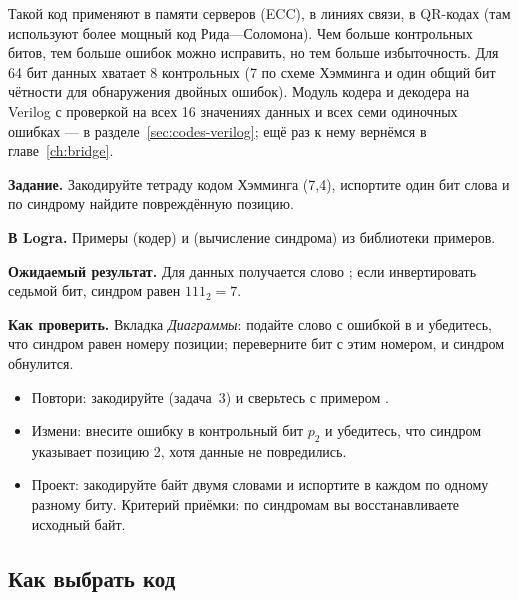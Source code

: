 Такой код применяют в памяти серверов (ECC), в линиях связи, в QR-кодах (там
используют более мощный код Рида---Соломона). Чем больше контрольных битов,
тем больше ошибок можно исправить, но тем больше избыточность. Для 64 бит
данных хватает 8 контрольных (7 по схеме Хэмминга и один общий бит чётности
для обнаружения двойных ошибок). Модуль кодера и декодера на Verilog
с проверкой на всех 16 значениях данных и всех семи одиночных ошибках ---
в разделе~\ref{sec:codes-verilog}; ещё раз к нему вернёмся в
главе~\ref{ch:bridge}.

\begin{diybox}
\textbf{Задание.} Закодируйте тетраду кодом Хэмминга (7,4), испортите один бит
слова и по синдрому найдите повреждённую позицию.\par
\textbf{В Logra.} Примеры  (кодер) и
 (вычисление синдрома) из библиотеки примеров.\par
\textbf{Ожидаемый результат.} Для данных  получается слово
; если инвертировать седьмой бит, синдром равен $111_2=7$.\par
\textbf{Как проверить.} Вкладка \emph{Диаграммы}: подайте слово с ошибкой в
 и убедитесь, что синдром равен номеру позиции;
переверните бит с этим номером, и синдром обнулится.
\begin{itemize}[leftmargin=3.4em,labelwidth=3em,labelsep=0.4em,align=left]
  \item[\stars{1}] Повтори: закодируйте  (задача~3) и сверьтесь с
    примером .
  \item[\stars{2}] Измени: внесите ошибку в контрольный бит $p_2$ и убедитесь,
    что синдром указывает позицию 2, хотя данные не повредились.
  \item[\stars{3}] Проект: закодируйте байт  двумя словами и испортите
    в каждом по одному разному биту. Критерий приёмки: по синдромам вы
    восстанавливаете исходный байт.
\end{itemize}
\end{diybox}

\subsection{Как выбрать код}

